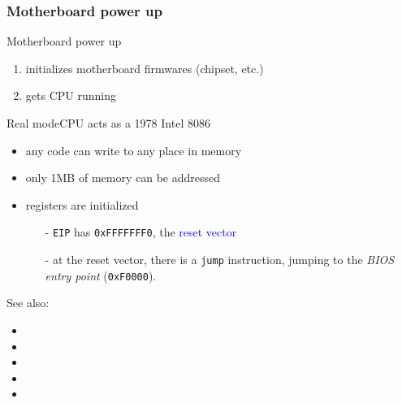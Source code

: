 \subsubsection{Motherboard power up}

\begin{frame}
  \begin{block}{Motherboard power up}
    \begin{enumerate}
    \item initializes motherboard firmwares (chipset, etc.)
    \item gets CPU running
    \end{enumerate}
  \end{block}
\end{frame}

\begin{frame}{Real mode}{CPU acts as a 1978 Intel 8086}
  \begin{minipage}{.52\textwidth}
    \begin{itemize}
    \item any code can write to any place in memory
    \item only 1MB of memory can be addressed
    \item registers are initialized
      \begin{itemize}
      \item[-] \texttt{EIP} has \texttt{0xFFFFFFF0}, the \textcolor{blue}{reset vector}
      \item[-] at the reset vector, there is a \texttt{jump} instruction, jumping to the
        \emph{BIOS entry point} (\texttt{0xF0000}).%
      \end{itemize}
    \end{itemize}
  \end{minipage}\hfill
  \begin{minipage}{.48\textwidth}
    \begin{center}
    \end{center}
  \end{minipage}
\end{frame}

See also:
\begin{itemize}
\item {}
\item {}
\item {}
\item {}
\item {}
\end{itemize}

